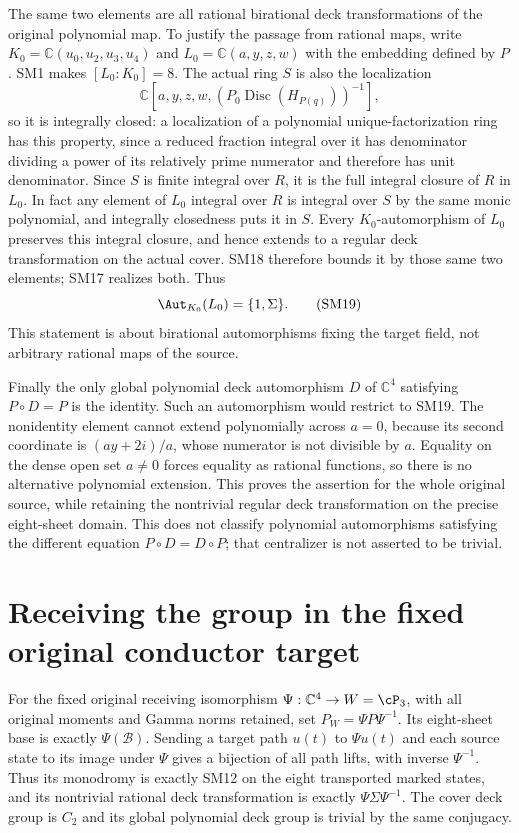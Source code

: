 \documentclass[11pt]{article}
\newcommand{\C}{\mathbb C}
\providecommand{\Disc}{\operatorname{Disc}}
\begin{document}
The same two elements are all rational birational deck
transformations of the original polynomial map. To justify the
passage from rational maps, write $K_0=\C(u_0,u_2,u_3,u_4)$
and $L_0=\C(a,y,z,w)$ with the embedding defined by $P$.
SM1 makes $[L_0:K_0]=8$. The actual ring $S$ is also the
localization
\[
 \C[a,y,z,w,(P_0\Disc(H_{P(q)}))^{-1}],
\]
so it is integrally closed: a localization of a polynomial
unique-factorization ring has this property, since a reduced
fraction integral over it has denominator dividing a power of
its relatively prime numerator and therefore has unit denominator.
Since $S$ is finite integral over $R$, it is the full integral
closure of $R$ in $L_0$. In fact any element of $L_0$ integral
over $R$ is integral over $S$ by the same monic polynomial,
and integrally closedness puts it in $S$.
Every $K_0$-automorphism of $L_0$ preserves this integral closure,
and hence extends to a regular deck transformation on the actual
cover. SM18 therefore bounds it by those same two elements;
SM17 realizes both. Thus
\begin{equation}
 \Aut_{K_0}(L_0)=\{1,\Sigma\}.\tag{SM19}
\end{equation}
This statement is about birational automorphisms fixing the
target field, not arbitrary rational maps of the source.

Finally the only global polynomial deck automorphism $D$ of $\C^4$
satisfying $P\circ D=P$ is the identity. Such an automorphism would
restrict to SM19. The nonidentity element cannot extend
polynomially across $a=0$, because its second coordinate is
$(ay+2i)/a$, whose numerator is not divisible by $a$.
Equality on the dense open set $a\ne0$ forces equality as
rational functions, so there is no alternative polynomial
extension. This proves the assertion for the whole original
source, while retaining the nontrivial regular deck
transformation on the precise eight-sheet domain. This does not
classify polynomial automorphisms satisfying the different equation
$P\circ D=D\circ P$; that centralizer is not asserted to be trivial.

\section{Receiving the group in the fixed original conductor target}
For the fixed original receiving isomorphism
$\Psi:\C^4\to W=\cP_3$, with all original moments and Gamma
norms retained, set $P_W=\Psi P\Psi^{-1}$. Its eight-sheet
base is exactly $\Psi(\mathcal B)$. Sending a target path
$u(t)$ to $\Psi u(t)$ and each source state to its image under
$\Psi$ gives a bijection of all path lifts, with inverse
$\Psi^{-1}$. Thus its monodromy is exactly SM12 on the eight
transported marked states, and its nontrivial rational deck
transformation is exactly $\Psi\Sigma\Psi^{-1}$. The cover
deck group is $C_2$ and its global polynomial deck group is
trivial by the same conjugacy.
\end{document}
